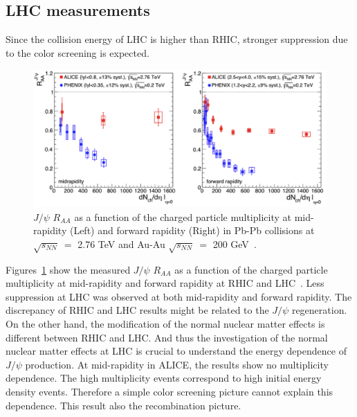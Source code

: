 \subsection{LHC measurements}
Since the collision energy of LHC is higher than RHIC,  stronger suppression due to the color screening is expected. 
\begin{figure}[!h]
	\centering
	  \includegraphics[width=15cm]{chap2/figure/experimentaldata/jpsiraa_npart.png}
 	 \caption{ $J/\psi$ $R_{AA}$ as a function of the charged particle multiplicity at mid-rapidity (Left) and forward rapidity (Right) in Pb-Pb collisions at $\sqrt{s_{NN}}~=$ 2.76 TeV and Au-Au $\sqrt{s_{NN}}~=$ 200 GeV~\cite{bib_anton}. }
  \label{fig_2_raanpart}
\end{figure}
Figures~\ref{fig_2_raanpart} show the measured $J/\psi$ $R_{AA}$ as a function of the charged particle multiplicity at mid-rapidity and forward rapidity at RHIC and LHC~\cite{bib_anton}.
Less suppression at LHC was observed  at both mid-rapidity and forward rapidity. 
The discrepancy of RHIC and LHC results might be related to the $J/\psi$ regeneration. 
On the other hand, the modification of the normal nuclear matter effects is different between RHIC and LHC. 
And thus the investigation of the normal nuclear matter effects at LHC is crucial to understand the energy dependence of $J/\psi$ production. 
At mid-rapidity in ALICE, the results show no multiplicity dependence. 
The high multiplicity events correspond to high initial energy density events. 
Therefore a simple color screening picture cannot explain this dependence. 
This result also the recombination picture. 

